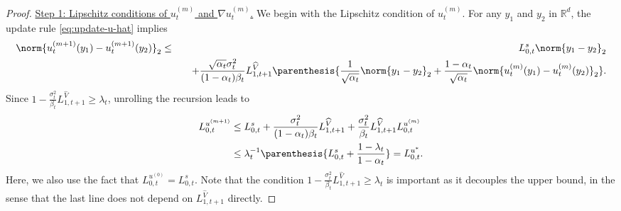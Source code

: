 \documentclass{article}
\newcommand{\R}{\mathbb{R}}
\begin{document}
\begin{proof}
\underline{Step 1: Lipschitz conditions of $ u_{t}^{(m)} $ and $ \nabla u_{t}^{(m)}$.}
We begin with the Lipschitz condition of $ u_{t}^{(m)} $.  For any $y_1$ and $y_2$ in $\R^d$, the update rule \eqref{eq:update-u-hat} implies
\begin{eqnarray*}
\norm{u_{t}^{(m+1)}(y_{1}) - u_{t}^{(m+1)}(y_{2})}_{2} &\leq& L_{0, t}^{s}\norm{y_{1} - y_{2}}_{2}  \\
&& \quad +\frac{\sqrt{\alpha_{t}}\sigma_{t}^{2}}{(1 - \alpha_{t})\beta_{t}}L_{1, t+1}^{\widehat{V}}\parenthesis{\frac{1}{\sqrt{\alpha_{t}}}\norm{y_{1} - y_{2}}_{2} + \frac{1 - \alpha_{t}}{\sqrt{\alpha_{t}}}\norm{u_{t}^{(m)}(y_{1}) - u_{t}^{(m)}(y_{2})}_2}.
\end{eqnarray*}
Since $ 1 - \frac{\sigma_{t}^{2}}{\beta_{t}}L_{1, t+1}^{\widehat{V}} \geq \lambda_{t} $, unrolling the recursion leads to 
\begin{align*}
    L_{0, t}^{u^{(m+1)}} & \leq L_{0,t}^{s} + \frac{\sigma_{t}^{2}}{(1 - \alpha_{t})\beta_{t}}L_{1,t+1}^{\widehat{V}} + \frac{\sigma^{2}_{t}}{\beta_{t}}L_{1,t+1}^{\widehat{V}}L_{0, t}^{u^{(m)}} \\ & \leq \lambda_{t}^{-1}\parenthesis{L_{0,t}^{s} + \frac{1 - \lambda_{t}}{1 - \alpha_{t}}} = L_{0, t}^{u^{*}}.
\end{align*}
Here, we also use the fact that $ L_{0, t}^{u^{(0)}} = L_{0, t}^{s} $.  Note that the condition $ 1 - \frac{\sigma_{t}^{2}}{\beta_{t}}L_{1, t+1}^{\widehat{V}} \geq \lambda_{t} $ is important as it decouples the upper bound, in the sense that the last line does not depend on $L^{\widehat V}_{1,t+1}$ directly.
%


\end{proof}
\end{document}
